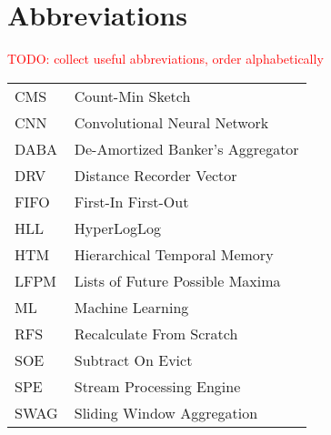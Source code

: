 \chapter*{Abbreviations}

\textcolor{red}{TODO: collect useful abbreviations, order alphabetically}

\begin{flushleft}
\begin{tabular}{l p{0.8\linewidth}}
CMS      & Count-Min Sketch\\
CNN      & Convolutional Neural Network\\
DABA     & De-Amortized Banker’s Aggregator\\
DRV      & Distance Recorder Vector\\
FIFO     & First-In First-Out\\
HLL      & HyperLogLog\\
HTM      & Hierarchical Temporal Memory\\
LFPM     & Lists of Future Possible Maxima\\ 
ML       & Machine Learning\\
RFS      & Recalculate From Scratch\\
SOE      & Subtract On Evict\\
SPE      & Stream Processing Engine\\
SWAG     & Sliding Window Aggregation\\
\end{tabular}
\end{flushleft}

